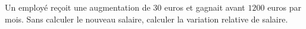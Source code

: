 
\begin{exercice}\label{exosmath-0031}

    Un employé reçoit une augmentation de \( 30\) euros et gagnait avant \( 1200\) euros par mois. Sans calculer le nouveau salaire, calculer la variation relative de salaire.

\end{exercice}
